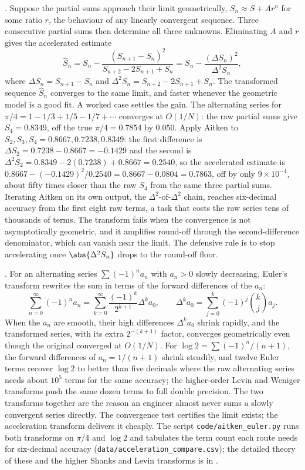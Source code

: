 . Suppose the partial sums
approach their limit geometrically, $S_{n} \approx S + A r^{n}$ for some
ratio $r$, the behaviour of any linearly convergent sequence. Three
consecutive partial sums then determine all three unknowns. Eliminating
$A$ and $r$ gives the accelerated estimate
\[
\widehat{S}_{n} = S_{n} - \frac{(S_{n+1} - S_{n})^{2}}{S_{n+2} - 2
S_{n+1} + S_{n}} = S_{n} - \frac{(\Delta S_{n})^{2}}{\Delta^{2} S_{n}},
\]
where $\Delta S_{n} = S_{n+1} - S_{n}$ and $\Delta^{2} S_{n} = S_{n+2}
- 2 S_{n+1} + S_{n}$. The transformed sequence $\widehat{S}_{n}$
converges to the same limit, and faster whenever the geometric model is
a good fit. A worked case settles the gain. The alternating series for
$\pi/4 = 1 - 1/3 + 1/5 - 1/7 + \cdots$ converges at $O(1/N)$: the raw
partial sums give $S_{4} = 0.8349$, off the true $\pi/4 = 0.7854$ by
$0.050$. Apply Aitken to $S_{2}, S_{3}, S_{4} = 0.8667, 0.7238, 0.8349$:
the first difference is $\Delta S_{2} = 0.7238 - 0.8667 = -0.1429$ and
the second is $\Delta^{2} S_{2} = 0.8349 - 2(0.7238) + 0.8667 = 0.2540$,
so the accelerated estimate is $0.8667 - (-0.1429)^{2}/0.2540 = 0.8667 -
0.0804 = 0.7863$, off by only $9 \times 10^{-4}$, about fifty times
closer than the raw $S_{4}$ from the same three partial sums. Iterating
Aitken on its own output, the $\Delta^{2}$-of-$\Delta^{2}$ chain,
reaches six-decimal accuracy from the first eight raw terms, a task that
costs the raw series tens of thousands of terms. The transform fails when the convergence is not
asymptotically geometric, and it amplifies round-off through the
second-difference denominator, which can vanish near the limit. The
defensive rule is to stop accelerating once $\abs{\Delta^{2} S_{n}}$
drops to the round-off floor.

. For an alternating series $\sum (-1)^{n}
a_{n}$ with $a_{n} > 0$ slowly decreasing, Euler's transform rewrites
the sum in terms of the forward differences of the $a_{n}$:
\[
\sum_{n=0}^{\infty} (-1)^{n} a_{n} = \sum_{k=0}^{\infty}
\frac{(-1)^{k}}{2^{k+1}} \Delta^{k} a_{0}, \qquad \Delta^{k} a_{0} =
\sum_{j=0}^{k} (-1)^{j} \binom{k}{j} a_{j}.
\]
When the $a_{n}$ are smooth, their high differences $\Delta^{k} a_{0}$
shrink rapidly, and the transformed series, with its extra $2^{-(k+1)}$
factor, converges geometrically even though the original converged at
$O(1/N)$. For $\log 2 = \sum (-1)^{n}/(n+1)$, the forward differences of
$a_{n} = 1/(n+1)$ shrink steadily, and twelve Euler terms recover $\log
2$ to better than five decimals where the raw alternating series needs
about $10^{5}$ terms for the same accuracy; the higher-order Levin and
Weniger transforms push the same dozen terms to full double precision.
The two transforms together are the reason an engineer almost never sums
a slowly convergent series directly. The convergence test certifies the
limit exists; the acceleration transform delivers it cheaply. The
script \texttt{code/aitken\_euler.py} runs both transforms on
$\pi/4$ and $\log 2$ and tabulates the term count each route needs for
six-decimal accuracy (\texttt{data/acceleration\_compare.csv}); the
detailed theory of these and the higher Shanks and Levin transforms is
in \cite{text:v2ch04-bender-orszag-1999}.

